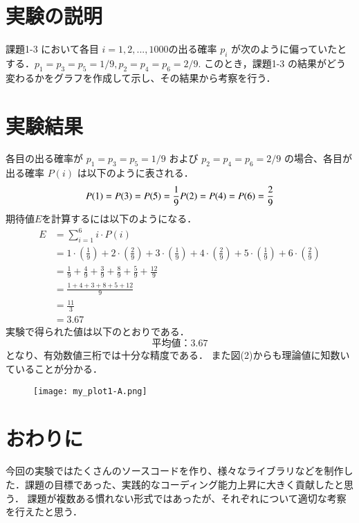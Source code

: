 \documentclass[fleqn, a4paper. 12pt]{ltjsarticle} %
\begin{document}
\section*{実験の説明}
課題1-3 において各目 $i=1,2,...,1000  $の出る確率 $p_i$ が次のように偏っていたとする．$p_1 = p_3 =
p_5 = 1/9, p_2 = p_4 = p_6 = 2/9$. このとき，課題1-3 の結果がどう変わるかをグラフを作成して示し、その結果から考察を行う．
\section*{実験結果}
各目の出る確率が $p_1 = p_3 = p_5 = 1/9$ および $p_2 = p_4 = p_6 = 2/9$ の場合、各目が出る確率 $P(i)$ は以下のように表される．
\begin{equation}
  P(1) = P(3) = P(5) = \frac{1}{9}\\
  P(2) = P(4) = P(6) = \frac{2}{9}
\end{equation}
期待値$E$を計算するには以下のようになる．
\begin{align*}
  E &= \sum_{i=1}^{6} i \cdot P(i) \\[8pt]
  &= 1 \cdot \left(\frac{1}{9}\right) + 2 \cdot \left(\frac{2}{9}\right) + 3 \cdot \left(\frac{1}{9}\right) + 4 \cdot \left(\frac{2}{9}\right) + 5 \cdot \left(\frac{1}{9}\right) + 6 \cdot \left(\frac{2}{9}\right) \\[8pt]
  &= \frac{1}{9} + \frac{4}{9} + \frac{3}{9} + \frac{8}{9} + \frac{5}{9} + \frac{12}{9} \\[8pt]
  &= \frac{1 + 4 + 3 + 8 + 5 + 12}{9} \\[8pt]
  &= \frac{11}{3} \\[8pt]
  &= 3.67
\end{align*}
実験で得られた値は以下のとおりである．
\begin{equation}
  平均値：3.67
\end{equation}
となり、有効数値三桁では十分な精度である．
また図(2)からも理論値に知数いていることが分かる．
\begin{figure}[tb]
  \centering
  \texttt{[image: my\_plot1-A.png]}
  \label{f2}
  \caption{}
\end{figure}
\section*{おわりに}
今回の実験ではたくさんのソースコードを作り、様々なライブラリなどを制作した．課題の目標であった、実践的なコーディング能力上昇に大きく貢献したと思う．
課題が複数ある慣れない形式ではあったが、それぞれについて適切な考察を行えたと思う．
\newpage

 
\newpage
\end{document}

